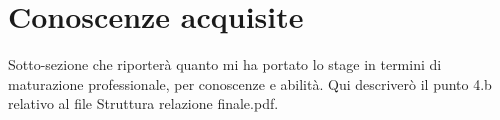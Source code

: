 \section{Conoscenze acquisite}

Sotto-sezione che riporterà quanto mi ha portato lo stage in termini di maturazione professionale, per conoscenze e abilità.
Qui descriverò il punto 4.b relativo al file Struttura relazione finale.pdf.